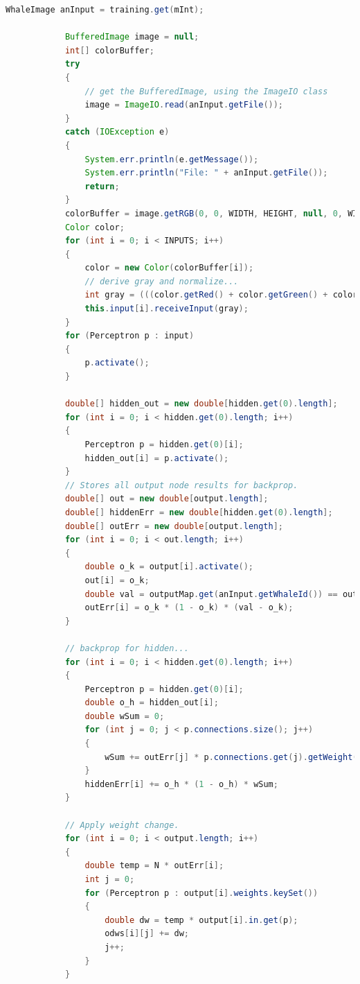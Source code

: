 \documentclass[10pt]{IEEEtran}
\newcommand{\?}{\stackrel{?}{=}}
\begin{document}
\begin{appendices}
\begin{lstlisting}[language=Java]
            WhaleImage anInput = training.get(mInt);

            BufferedImage image = null;
            int[] colorBuffer;
            try
            {
                // get the BufferedImage, using the ImageIO class
                image = ImageIO.read(anInput.getFile());
            }
            catch (IOException e)
            {
                System.err.println(e.getMessage());
                System.err.println("File: " + anInput.getFile());
                return;
            }
            colorBuffer = image.getRGB(0, 0, WIDTH, HEIGHT, null, 0, WIDTH);
            Color color;
            for (int i = 0; i < INPUTS; i++)
            {
                color = new Color(colorBuffer[i]);
                // derive gray and normalize...
                int gray = (((color.getRed() + color.getGreen() + color.getBlue()) / 3) / 255) * 2 - 1;
                this.input[i].receiveInput(gray);
            }
            for (Perceptron p : input)
            {
                p.activate();
            }

            double[] hidden_out = new double[hidden.get(0).length];
            for (int i = 0; i < hidden.get(0).length; i++)
            {
                Perceptron p = hidden.get(0)[i];
                hidden_out[i] = p.activate();
            }
            // Stores all output node results for backprop.
            double[] out = new double[output.length];
            double[] hiddenErr = new double[hidden.get(0).length];
            double[] outErr = new double[output.length];
            for (int i = 0; i < out.length; i++)
            {
                double o_k = output[i].activate();
                out[i] = o_k;
                double val = outputMap.get(anInput.getWhaleId()) == output[i] ? .9 : .1;
                outErr[i] = o_k * (1 - o_k) * (val - o_k);
            }

            // backprop for hidden...
            for (int i = 0; i < hidden.get(0).length; i++)
            {
                Perceptron p = hidden.get(0)[i];
                double o_h = hidden_out[i];
                double wSum = 0;
                for (int j = 0; j < p.connections.size(); j++)
                {
                    wSum += outErr[j] * p.connections.get(j).getWeight(p);
                }
                hiddenErr[i] += o_h * (1 - o_h) * wSum;
            }

            // Apply weight change.
            for (int i = 0; i < output.length; i++)
            {
                double temp = N * outErr[i];
                int j = 0;
                for (Perceptron p : output[i].weights.keySet())
                {
                    double dw = temp * output[i].in.get(p);
                    odws[i][j] += dw;
                    j++;
                }
            }


\end{lstlisting}
\end{appendices}
\end{document}
